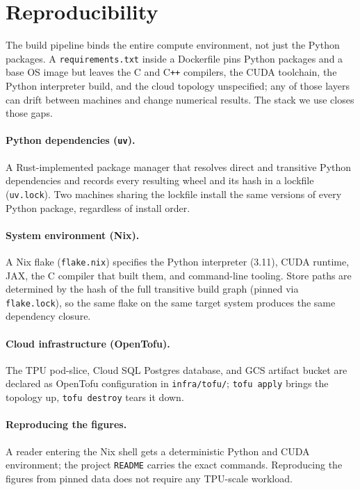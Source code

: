 \section{Reproducibility}\label{app:reproducibility}

The build pipeline binds the entire compute environment, not just the
Python packages. A \texttt{requirements.txt} inside a Dockerfile pins
Python packages and a base OS image but leaves the C and
C\nolinkurl{++} compilers, the CUDA toolchain, the Python interpreter
build, and the cloud topology unspecified; any of those layers can
drift between machines and change numerical results. The stack we use
closes those gaps.

\paragraph{Python dependencies (\texttt{uv}).} A Rust-implemented
package manager that resolves direct and transitive Python
dependencies and records every resulting wheel and its hash in a
lockfile (\texttt{uv.lock}). Two machines sharing the lockfile
install the same versions of every Python package, regardless of
install order.

\paragraph{System environment (Nix).} A Nix flake (\texttt{flake.nix})
specifies the Python interpreter (3.11), CUDA runtime, JAX, the C
compiler that built them, and command-line tooling. Store paths are
determined by the hash of the full transitive build graph (pinned via
\texttt{flake.lock}), so the same flake on the same target system
produces the same dependency closure.

\paragraph{Cloud infrastructure (OpenTofu).} The TPU pod-slice, Cloud
SQL Postgres database, and GCS artifact bucket are declared as
OpenTofu configuration in \texttt{infra/tofu/}; \texttt{tofu apply}
brings the topology up, \texttt{tofu destroy} tears it down.

\paragraph{Reproducing the figures.} A reader entering the Nix shell
gets a deterministic Python and CUDA environment; the project
\texttt{README} carries the exact commands. Reproducing the figures
from pinned data does not require any TPU-scale workload.

